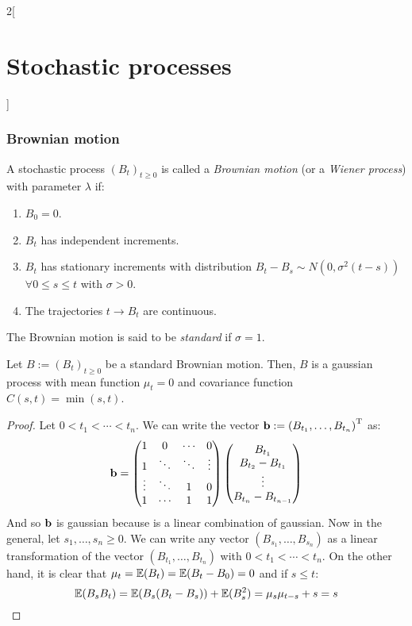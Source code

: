 \documentclass[../../../main_math.tex]{subfiles}
\begin{document}
\begin{multicols}{2}[\section{Stochastic processes}]
  \subsubsection{Brownian motion}
  \begin{definition}
    A stochastic process ${(B_t)}_{t\geq 0}$ is called a \emph{Brownian motion} (or a \emph{Wiener process}) with parameter $\lambda$ if:
    \begin{enumerate}
      \item $B_0=0$.
      \item $B_t$ has independent increments.
      \item $B_t$ has stationary increments with distribution $B_t-B_s\sim N(0,\sigma^2(t-s))$ $\forall 0\leq s\leq t$ with $\sigma>0$.
      \item The trajectories $t\to B_t$ are continuous.
    \end{enumerate}
    The Brownian motion is said to be \emph{standard} if $\sigma=1$.
  \end{definition}
  \begin{proposition}
    Let $B:={(B_t)}_{t\geq 0}$ be a standard Brownian motion. Then, $B$ is a gaussian process with mean function $\mu_t=0$ and covariance function $C(s,t)=\min(s,t)$.
  \end{proposition}
  \begin{proof}
    Let $0< t_1<\cdots<t_n$. We can write the vector $\boldsymbol{\mathrm{b}}:={(B_{t_1},\ldots,B_{t_n})}^{\mathrm{T}}$ as:
    $$
      \boldsymbol{\mathrm{b}}=\begin{pmatrix}
        1      & 0      & \cdots & 0      \\
        1      & \ddots & \ddots & \vdots \\
        \vdots & \ddots & 1      & 0      \\
        1      & \cdots & 1      & 1
      \end{pmatrix}
      \begin{pmatrix}
        B_{t_1}           \\
        B_{t_2} - B_{t_1} \\
        \vdots            \\
        B_{t_n} - B_{t_{n-1}}
      \end{pmatrix}
    $$
    And so $\boldsymbol{\mathrm{b}}$ is gaussian because is a linear combination of gaussian. Now in the general, let $s_1, \ldots, s_n\geq 0$. We can write any vector $(B_{s_1}, \ldots, B_{s_n})$ as a linear transformation of the vector $(B_{t_1}, \ldots, B_{t_n})$ with $0< t_1<\cdots<t_n$. On the other hand, it is clear that $\mu_t=\mathbb{E}(B_t)=\mathbb{E}(B_t-B_0)=0$ and if $s\leq t$: $$\mathbb{E}(B_sB_t)=\mathbb{E}(B_s(B_t-B_s))+\mathbb{E}(B_s^2)=\mu_s\mu_{t-s}+s=s$$

\end{proof}
\end{multicols}
\end{document}

